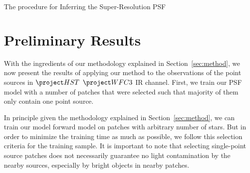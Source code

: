 \begin{algorithm} 
\caption{The procedure for Inferring the Super-Resolution PSF}
\begin{algorithmic}[1] \label{alg:supermean}

\STATE $\epsilon_t \gets \infty$
   \STATE // \emph{This can now be done in parallel for all i}

   \STATE $b_{n}$ \gets {} \; $(y_{n})$
   \STATE $f_{n}$ \gets $\sum_{i=1}^{N_pix} \big(y_{n,i} - b_{n}\big)$
   \STATE {} $\Delta_{n}$ with the 3  polynomial method
   \STATE $X_{n}$ \gets {} $(\Delta_n)[\big(y_{n,i} - b_{n}\big)/f_n]$
\ENDFOR
\STATE $X$ \gets $\sum_{n=1}^{N} X_{n]$

\ENDIF
\IF{$t=2,...,N_{it}:$}
\FOR{$i=1,...,N$}

   \WHILE{$\rho(X,D)>\epsilon_t$}
   \STATE Draw $\pars^{*}_{t}$ from $\{\pars_{t-1}\}$ with probabilities $\{w_{t-1}\}$
   \STATE $\pars^{*}_{t} \gets K(\pars^{*}_{t},.)$
   \STATE $X = f(\pars^{*}_{t})$
   \ENDWHILE
   \STATE $\pars^{(i)}_{t} \gets \pars^{*}_{t}$
   \STATE $w^{(i)}_{t} \gets \pi(\pars^{(i)}_{t}) / \big(\sum\limits_{j=1}^{N}w_{t-1}^{(i)}K(\pars^{(j)}_{t-1},\pars^{(i)}_{t}) \big)$
\ENDFOR
\ENDIF

\end{algorithmic}
\end{algorithm}

\section{Preliminary Results}\label{sec:results}

With the ingredients of our methodology explained in Section~\ref{sec:method}, we now present the results of applying our 
method to the observations of the point sources in $\hst$ $\wfc$ IR channel. First, we train our PSF model with a number of 
patches that were selected such that majority of them only contain one point source. 

In principle given the methodology explained in Section~\ref{sec:method}, we can train our model forward model on patches with arbitrary 
number of stars. But in order to minimize the training time as much as possible, we follow this selection criteria for the training sample.
It is important to note that selecting single-point source patches does not necessarily guarantee no light contamination by the nearby sources, 
especially by bright objects in nearby patches.

